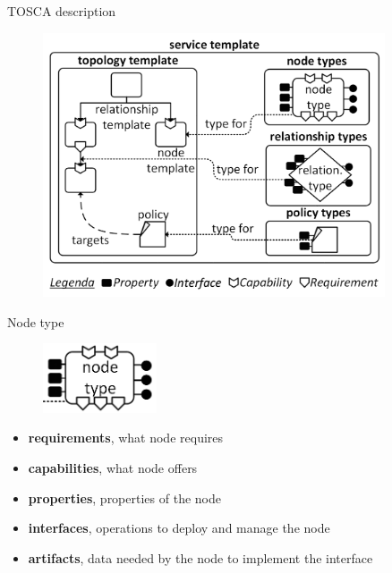 \documentclass{beamer}
\begin{document}
  \begin{frame}{TOSCA description}
    \begin{figure}
      \includegraphics[width=0.9\textwidth]{img/service-template.png}
    \end{figure}
  \end{frame}

  \begin{frame}{Node type}
    \begin{figure}
      \includegraphics[width=0.3\textwidth]{img/tosca_node_type.png}
    \end{figure}
    \begin{itemize}
      \item \textbf{requirements}, what node requires
      \item \textbf{capabilities}, what node offers
      \item \textbf{properties}, properties of the node
      \item \textbf{interfaces}, operations to deploy and manage the node
      \item \textbf{artifacts}, data needed by the node to implement the interface
    \end{itemize}
  \end{frame}
\end{document}
